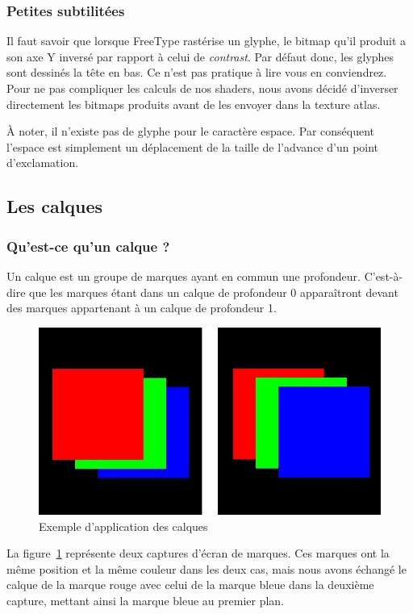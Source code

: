 \documentclass[12pt]{article}
\begin{document}
\subsubsection{Petites subtilitées}

Il faut savoir que lorsque FreeType rastérise un glyphe, le bitmap qu'il produit a son axe Y inversé par rapport à celui de \textit{contrast}. Par défaut donc, les glyphes sont dessinés la tête en bas.
Ce n'est pas pratique à lire vous en conviendrez. Pour ne pas compliquer les calculs de nos shaders, nous avons décidé d'inverser directement les bitmaps produits avant de les envoyer
dans la texture atlas.

À noter, il n'existe pas de glyphe pour le caractère espace. Par conséquent l'espace est simplement un déplacement de la taille de l'advance d'un point d'exclamation.

\subsection{Les calques}
\subsubsection{Qu'est-ce qu'un calque ?}
Un calque est un groupe de marques ayant en commun une profondeur. C'est-à-dire que les marques étant dans
un calque de profondeur 0 apparaîtront devant des marques appartenant à un calque de profondeur 1.

\begin{figure}[htp]
  \centering
  \includegraphics[scale=0.8]{images/calque-exemple}
  \caption{Exemple d'application des calques}
  \label{fig:calque-ex}
\end{figure}

La figure~\ref{fig:calque-ex} représente deux captures d'écran de marques.
Ces marques ont la même position et la même couleur dans les deux cas, mais nous avons échangé le calque
de la marque rouge avec celui de la marque bleue dans la deuxième capture, mettant ainsi la marque bleue
au premier plan.
\end{document}
